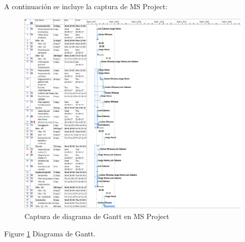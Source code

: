 \par A continuación se incluye la captura de MS Project:
\begin{figure}
  \centering
    \includegraphics[width=1\textwidth]{img/gantt.png}
  \caption{Captura de diagrama de Gantt en MS Project}
  \label{fig:gantt}
\end{figure}
Figure \ref{fig:gantt} Diagrama de Gantt.